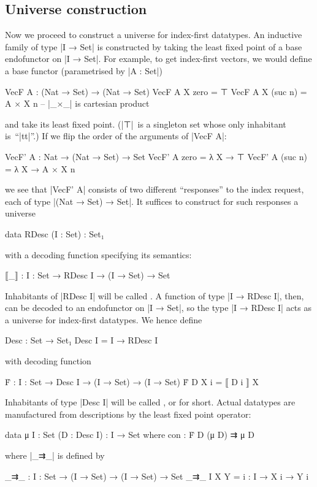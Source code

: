 \subsection{Universe construction}
\label{sec:Desc}

Now we proceed to construct a universe for index-first datatypes.
An inductive family of type |I → Set| is constructed by taking the least fixed point of a base endofunctor on |I → Set|.
For example, to get index-first vectors, we would define a base functor (parametrised by |A : Set|)
\begin{code}
VecF A : (Nat → Set) → (Nat → Set)
VecF A X zero     =  ⊤
VecF A X (suc n)  =  A × X n  -- |_×_| is cartesian product
\end{code}
and take its least fixed point.
(|⊤|~is a singleton set whose only inhabitant is~``|tt|''.)
If we flip the order of the arguments of |VecF A|:
\begin{code}
VecF' A : Nat → (Nat → Set) → Set
VecF' A zero     =  λ X → ⊤
VecF' A (suc n)  =  λ X → A × X n
\end{code}
we see that |VecF' A| consists of two different ``responses'' to the index request, each of type |(Nat → Set) → Set|.
It suffices to construct for such responses a universe
\begin{code}
data RDesc (I : Set) : Set₁
\end{code}
with a decoding function specifying its semantics:
\begin{code}
⟦_⟧ : {I : Set} → RDesc I → (I → Set) → Set
\end{code}
Inhabitants of |RDesc I| will be called .
A function of type |I → RDesc I|, then, can be decoded to an endofunctor on |I → Set|, so the type |I → RDesc I| acts as a universe for index-first datatypes.
We hence define
\begin{code}
Desc : Set → Set₁
Desc I = I → RDesc I
\end{code}
with decoding function
\begin{code}
Ḟ : {I : Set} → Desc I → (I → Set) → (I → Set)
Ḟ D X i = ⟦ D i ⟧ X
\end{code}
Inhabitants of type |Desc I| will be called , or  for short.
Actual datatypes are manufactured from descriptions by the least fixed point operator:
\begin{code}
data μ {I : Set} (D : Desc I) : I → Set where
  con : Ḟ D (μ D) ⇉ μ D
\end{code}
where |_⇉_| is defined by
\begin{code}
_⇉_ : {I : Set} → (I → Set) → (I → Set) → Set
_⇉_ {I} X Y = {i : I} → X i → Y i
\end{code}

